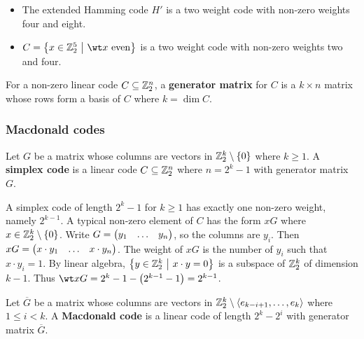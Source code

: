 \begin{example*}
\hfill
\begin{itemize}
\item The extended Hamming code $ H' $ is a two weight code with non-zero weights four and eight.
\item $ C = \cbr{x \in \ZZ_2^5 \st \wt x \ \text{even}} $ is a two weight code with non-zero weights two and four.
\end{itemize}
\end{example*}

\begin{definition*}
For a non-zero linear code $ C \subseteq \mathbb{Z}_2^n $, a \textbf{generator matrix} for $ C $ is a $ k \times n $ matrix whose rows form a basis of $ C $ where $ k = \dim C $.
\end{definition*}

\pagebreak

\subsubsection{Macdonald codes}

\begin{definition*}
Let $ G $ be a matrix whose columns are vectors in $ \ZZ_2^k \setminus \cbr{0} $ where $ k \ge 1 $. A \textbf{simplex code} is a linear code $ C \subseteq \mathbb{Z}_2^n $ where $ n = 2^k - 1 $ with generator matrix $ G $.
\end{definition*}

\begin{fact*}
A simplex code of length $ 2^k - 1 $ for $ k \ge 1 $ has exactly one non-zero weight, namely $ 2^{k - 1} $. A typical non-zero element of $ C $ has the form $ xG $ where $ x \in \ZZ_2^k \setminus \cbr{0} $. Write $ G = \onebythree{y_1}{\dots}{y_n} $, so the columns are $ y_i $. Then $ xG = \onebythree{x \cdot y_1}{\dots}{x \cdot y_n} $. The weight of $ xG $ is the number of $ y_i $ such that $ x \cdot y_i = 1 $. By linear algebra, $ \cbr{y \in \ZZ_2^k \st x \cdot y = 0} $ is a subspace of $ \mathbb{Z}_2^k $ of dimension $ k - 1 $. Thus $ \wt xG = 2^k - 1 - \br{2^{k - 1} - 1} = 2^{k - 1} $.
\end{fact*}

\begin{definition*}
Let $ \overline{G} $ be a matrix whose columns are vectors in $ \mathbb{Z}_2^k \setminus \left\langle e_{k - i + 1}, \dots, e_k \right\rangle $ where $ 1 \le i < k $. A \textbf{Macdonald code} is a linear code of length $ 2^k - 2^i $ with generator matrix $ \overline{G} $.
\end{definition*}

